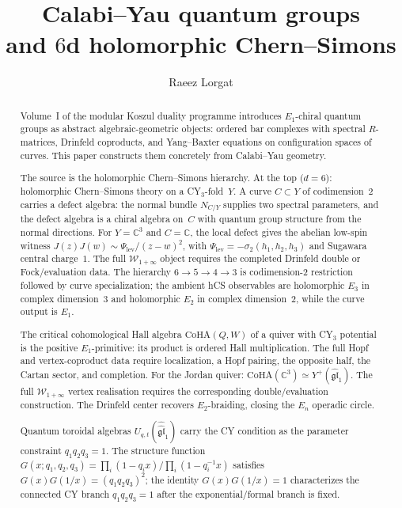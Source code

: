 \documentclass[11pt]{article}
\title{Calabi--Yau quantum groups\\
and $6$d holomorphic Chern--Simons}
\author{Raeez Lorgat}
\date{}
\theoremstyle{plain}
\theoremstyle{definition}
\theoremstyle{remark}
\newcommand{\fgl}{\mathfrak{gl}}
\newcommand{\cW}{\mathcal{W}}
\newcommand{\bC}{\mathbb{C}}
\newcommand{\Eone}{E_1}
\newcommand{\Etwo}{E_2}
\newcommand{\En}{E_n}
\newcommand{\CoHA}{\mathrm{CoHA}}
\begin{document}
\maketitle


\begin{abstract}
Volume~I of the modular Koszul duality programme introduces
$\Eone$-chiral quantum groups as abstract algebraic-geometric
objects: ordered bar complexes with spectral $R$-matrices, Drinfeld
coproducts, and Yang--Baxter equations on configuration spaces of
curves.  This paper constructs them concretely from Calabi--Yau
geometry.

The source is the holomorphic Chern--Simons hierarchy.  At the top
($d = 6$): holomorphic Chern--Simons theory on a CY$_3$-fold~$Y$.
A curve $C \subset Y$ of codimension~$2$ carries a defect algebra:
the normal bundle $N_{C/Y}$ supplies two spectral parameters, and
the defect algebra is a chiral algebra on~$C$ with quantum group
structure from the normal directions.  For $Y = \bC^3$ and
$C = \bC$, the local defect gives the abelian low-spin witness
$J(z)J(w)\sim\Psi_{\mathrm{lev}}/(z-w)^2$, with
$\Psi_{\mathrm{lev}}=-\sigma_2(h_1,h_2,h_3)$ and Sugawara
central charge~$1$.  The full $\cW_{1+\infty}$ object requires the
completed Drinfeld double or Fock/evaluation data. The hierarchy
$6 \to 5 \to 4 \to 3$ is codimension-$2$ restriction followed by
curve specialization; the ambient hCS observables are holomorphic
$E_3$ in complex dimension~$3$ and holomorphic $E_2$ in complex
dimension~$2$, while the curve output is $\Eone$.

The critical cohomological Hall algebra $\CoHA(Q, W)$ of a quiver
with CY$_3$ potential is the positive $\Eone$-primitive: its product
is ordered Hall multiplication. The full Hopf and vertex-coproduct
data require localization, a Hopf pairing, the opposite half, the
Cartan sector, and completion. For the Jordan quiver:
	$\CoHA(\bC^3) \simeq Y^+(\widehat{\fgl}_1)$. The full
	$\cW_{1+\infty}$ vertex realisation requires the corresponding
	double/evaluation construction.
The Drinfeld center recovers $\Etwo$-braiding, closing the $\En$
operadic circle.

Quantum toroidal algebras
$U_{q,t}(\widehat{\widehat{\fgl}}_1)$ carry the CY condition as
the parameter constraint $q_1 q_2 q_3 = 1$.  The structure
function
$G(x; q_1, q_2, q_3) = \prod_i(1 - q_i x)/\prod_i(1 - q_i^{-1}x)$
satisfies $G(x)G(1/x)=(q_1q_2q_3)^2$; the identity
$G(x)G(1/x)=1$ characterizes the connected CY branch
$q_1q_2q_3=1$ after the exponential/formal branch is fixed.


\end{abstract}
\end{document}
